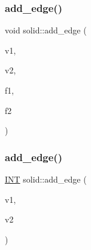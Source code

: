 \subsubsection{\texorpdfstring{add\+\_\+edge()}{add\_edge()}\hspace{0.1cm}{\footnotesize\ttfamily [1/2]}}
{\footnotesize\ttfamily void solid\+::add\+\_\+edge (\begin{DoxyParamCaption}\item[{\mbox{\hyperlink{galois_8h_a09fddde158a3a20bd2dcadb609de11dc}{I\+NT}}}]{v1,  }\item[{\mbox{\hyperlink{galois_8h_a09fddde158a3a20bd2dcadb609de11dc}{I\+NT}}}]{v2,  }\item[{\mbox{\hyperlink{galois_8h_a09fddde158a3a20bd2dcadb609de11dc}{I\+NT}}}]{f1,  }\item[{\mbox{\hyperlink{galois_8h_a09fddde158a3a20bd2dcadb609de11dc}{I\+NT}}}]{f2 }\end{DoxyParamCaption})}

\mbox{\label{classsolid_a915c83080299c3787b78805fd670470e}} 
\subsubsection{\texorpdfstring{add\+\_\+edge()}{add\_edge()}\hspace{0.1cm}{\footnotesize\ttfamily [2/2]}}
{\footnotesize\ttfamily \mbox{\hyperlink{galois_8h_a09fddde158a3a20bd2dcadb609de11dc}{I\+NT}} solid\+::add\+\_\+edge (\begin{DoxyParamCaption}\item[{\mbox{\hyperlink{galois_8h_a09fddde158a3a20bd2dcadb609de11dc}{I\+NT}}}]{v1,  }\item[{\mbox{\hyperlink{galois_8h_a09fddde158a3a20bd2dcadb609de11dc}{I\+NT}}}]{v2 }\end{DoxyParamCaption})}

\mbox{\label{classsolid_a6875ab7d3238826f030bae684137f789}} 
